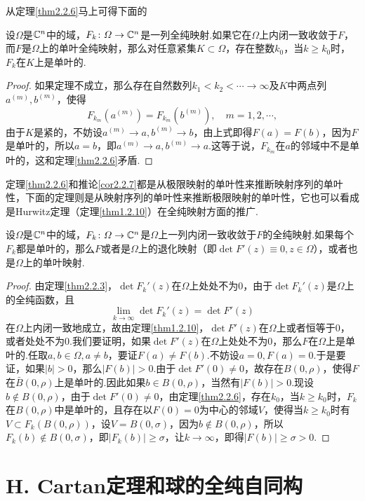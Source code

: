 从定理\ref{thm2.2.6}马上可得下面的
\begin{corollary}\label{cor2.2.7}
	设$\Omega$是$\mathbb C^n$中的域，$F_k\colon\varOmega\to\mathbb C^n$是一列全纯映射.如果它在$\Omega$上内闭一致收敛于$F$，而$F$是$\Omega$上的单叶全纯映射，那么对任意紧集$K\subset\Omega$，存在整数$k_0$，当$k\ge k_0$时，$F_k$在$K$上是单叶的.
\end{corollary}
\begin{proof}
	如果定理不成立，那么存在自然数列$k_1<k_2<\cdots\to\infty$及$K$中两点列$a^{(m)},b^{(m)}$，使得
	\[F_{k_m}(a^{(m)})=F_{k_m}(b^{(m)}),\quad m=1,2,\cdots,\]
	由于$K$是紧的，不妨设$a^{(m)}\to a,b^{(m)}\to b$，由上式即得$F(a)=F(b)$，因为$F$是单叶的，所以$a=b$，即$a^{(m)}\to a,b^{(m)}\to a$.这等于说，$F_{k_m}$在$a$的邻域中不是单叶的，这和定理\ref{thm2.2.6}矛盾.
\end{proof}
定理\ref{thm2.2.6}和推论\ref{cor2.2.7}都是从极限映射的单叶性来推断映射序列的单叶性，下面的定理则是从映射序列的单叶性来推断极限映射的单叶性，它也可以看成是Hurwitz定理（定理\ref{thm1.2.10}）在全纯映射方面的推广.
\begin{theorem}\label{thm2.2.8}
	设$\Omega$是$\mathbb C^n$中的域，$F_k\colon\varOmega\to\mathbb C^n$是$\Omega$上一列内闭一致收敛于$F$的全纯映射.如果每个$F_k$都是单叶的，那么$F$或者是$\Omega$上的退化映射（即$\det F'(z)\equiv 0,z\in\Omega$），或者也是$\Omega$上的单叶映射.
\end{theorem}
\begin{proof}
	由定理\ref{thm2.2.3}，$\det F_k'(z)$在$\Omega$上处处不为$0$，由于$\det F_k'(z)$是$\Omega$上的全纯函数，且
	\[\lim\limits_{k\to\infty}\det F_k'(z)=\det F'(z)\]
	在$\Omega$上内闭一致地成立，故由定理\ref{thm1.2.10}，$\det F'(z)$在$\Omega$上或者恒等于$0$，或者处处不为$0$.我们要证明，如果$\det F'(z)$在$\Omega$上处处不为$0$，那么$F$在$\Omega$上是单叶的.任取$a,b\in\Omega,a\neq b$，要证$F(a)\neq F(b)$.不妨设$a=0,F(a)=0$.于是要证，如果$|b|>0$，那么$|F(b)|>0$.由于$\det F'(0)\neq 0$，故存在$B(0,\rho)$，使得$F$在$\bar{B}(0,\rho)$上是单叶的.因此如果$b\in B(0,\rho)$，当然有$|F(b)|>0$.现设$b\notin B(0,\rho)$，由于$\det F'(0)\neq 0$，由定理\ref{thm2.2.6}，存在$k_0$，当$k\ge k_0$时，$F_k$在$B(0,\rho)$中是单叶的，且存在以$F(0)=0$为中心的邻域$V$，使得当$k\ge k_0$时有$V\subset F_k(B(0,\rho))$，设$V=B(0,\sigma)$，因为$b\notin B(0,\rho)$，所以$F_k(b)\notin B(0,\sigma)$，即$|F_k(b)|\ge\sigma$，让$k\to\infty$，即得$|F(b)|\ge\sigma>0$.
\end{proof}
\section{H. Cartan定理和球的全纯自同构\label{sec2.3}}
